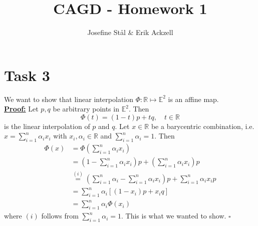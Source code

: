 \documentclass[]{article}
\title{CAGD - Homework 1}
\author{Josefine Stål \& Erik Ackzell}
\begin{document}
\maketitle

\section*{Task 3}
We want to show that linear interpolation $\Phi : \mathbb{R} \mapsto \mathbb{E}^2$ is an affine map.\\
\underline{\textbf{Proof:}} Let $p,q$ be arbitrary points in $\mathbb{E}^2$. Then \begin{equation*}
\Phi (t) = (1-t)p + tq, \quad t\in \mathbb{R}
\end{equation*}
is the linear interpolation of $p$ and $q$. Let $x\in \mathbb{R}$ be a barycentric combination, i.e. $x=\sum_{i=1}^{n}\alpha_i x_i$ with $x_i, \alpha_i\in \mathbb{R}$ and $\sum_{i=1}^{n}\alpha_i = 1$. Then \begin{equation*}
\begin{aligned}
\Phi (x) &= \Phi (\sum_{i=1}^{n}\alpha_i x_i)\\
&=(1-\sum_{i=1}^{n}\alpha_i x_i)p + (\sum_{i=1}^{n}\alpha_i x_i)p\\
&\overset{(i)}{=}(\sum_{i=1}^{n}\alpha_i-\sum_{i=1}^{n}\alpha_i x_i)p + \sum_{i=1}^{n}\alpha_i x_ip\\
&=\sum_{i=1}^{n}\alpha_i[(1-x_i)p + x_iq]\\
&=\sum_{i=1}^{n}\alpha_i\Phi(x_i)
\end{aligned}
\end{equation*}
where $(i)$ follows from $\sum_{i=1}^{n}\alpha_i=1$. This is what we wanted to show. $\square$
\end{document}

